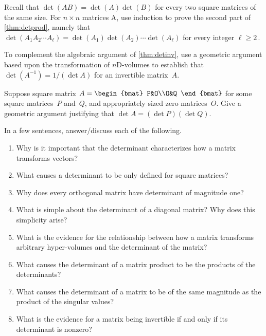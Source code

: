 \begin{exercise} \label{ex:detprodk} 
Recall that \(\det(AB)=\det(A)\det(B)\) for every two square matrices of the same size.
For \(n\times n\) matrices \hlist A\ell, use induction to prove the second part of \autoref{thm:detprod}, namely that \(\det(A_1A_2\cdots A_\ell)=\det(A_1)\det(A_2)\cdots\det(A_\ell)\) for every integer \(\ell\geq2\)\,.
\end{exercise}






\begin{exercise}  
To complement the algebraic argument of \autoref{thm:detinv}, use a geometric argument based upon the transformation of \(n\)D-volumes to establish that \(\det(A^{-1})=1/(\det A)\) for an invertible matrix~\(A\).
\end{exercise}




\begin{exercise}  
Suppose square matrix \(A=\begin{bmat} P&O\\O&Q \end{bmat}\) for some square matrices~\(P\) and~\(Q\), and appropriately sized zero matrices~\(O\).
Give a geometric argument justifying that \(\det A=(\det P)(\det Q)\).
\end{exercise}




\begin{exercise} 
In a few sentences, answer\slash discuss each of the following.
\begin{enumerate}
\item  Why is it important that the determinant characterizes how a matrix transforms vectors?

\item What causes a determinant to be only defined for square matrices?

\item Why does every orthogonal matrix have determinant of magnitude one?

\item What is simple about the determinant of a diagonal matrix?  Why does this simplicity arise?

\item What is the evidence for the relationship between how a matrix transforms arbitrary hyper-volumes and the determinant of the matrix?

\item What causes the determinant of a matrix product to be the products of the determinants?

\item What causes the determinant of a matrix to be of the same magnitude as the product of the singular values?

\item What is the evidence for a matrix being invertible if and only if its determinant is nonzero?

\end{enumerate}
\end{exercise}


\begin{comment}%
why, what caused X?
how did X occur?
what-if? what-if-not?
how does X compare with Y?
what is the evidence for X?
why is X important?
\end{comment}



